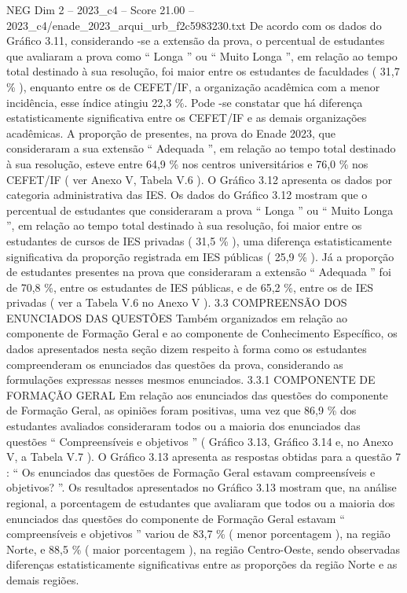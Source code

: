 \begin{textsample}{NEG Dim 2 – 2023\_c4 – Score 21.00 – 2023\_c4/enade\_2023\_arqui\_urb\_f2c5983230.txt}
De acordo com os dados do Gráfico 3.11, considerando -se a extensão da prova, o percentual de estudantes que avaliaram a prova como “ Longa ” ou “ Muito Longa ”, em relação ao tempo total destinado à sua resolução, foi maior entre os estudantes de faculdades ( 31,7 \% ), enquanto entre os de CEFET/IF, a organização acadêmica com a menor incidência, esse índice atingiu 22,3 \%.
Pode -se constatar que há diferença estatisticamente significativa entre os CEFET/IF e as demais organizações acadêmicas.
A proporção de presentes, na prova do Enade 2023, que consideraram a sua extensão “ Adequada ”, em relação ao tempo total destinado à sua resolução, esteve entre 64,9 \% nos centros universitários e 76,0 \% nos CEFET/IF ( ver Anexo V, Tabela V.6 ).
O Gráfico 3.12 apresenta os dados por categoria administrativa das IES.
Os dados do Gráfico 3.12 mostram que o percentual de estudantes que consideraram a prova “ Longa ” ou “ Muito Longa ”, em relação ao tempo total destinado à sua resolução, foi maior entre os estudantes de cursos de IES privadas ( 31,5 \% ), uma diferença estatisticamente significativa da proporção registrada em IES públicas ( 25,9 \% ).
Já a proporção de estudantes presentes na prova que consideraram a extensão “ Adequada ” foi de 70,8 \%, entre os estudantes de IES públicas, e de 65,2 \%, entre os de IES privadas ( ver a Tabela V.6 no Anexo V ). 3.3 COMPREENSÃO DOS ENUNCIADOS DAS QUESTÕES Também organizados em relação ao componente de Formação Geral e ao componente de Conhecimento Específico, os dados apresentados nesta seção dizem respeito à forma como os estudantes compreenderam os enunciados das questões da prova, considerando as formulações expressas nesses mesmos enunciados. 3.3.1 COMPONENTE DE FORMAÇÃO GERAL Em relação aos enunciados das questões do componente de Formação Geral, as opiniões foram positivas, uma vez que 86,9 \% dos estudantes avaliados consideraram todos ou a maioria dos enunciados das questões “ Compreensíveis e objetivos ” ( Gráfico 3.13, Gráfico 3.14 e, no Anexo V, a Tabela V.7 ).
O Gráfico 3.13 apresenta as respostas obtidas para a questão 7 : “ Os enunciados das questões de Formação Geral estavam compreensíveis e objetivos? ”.
Os resultados apresentados no Gráfico 3.13 mostram que, na análise regional, a porcentagem de estudantes que avaliaram que todos ou a maioria dos enunciados das questões do componente de Formação Geral estavam “ compreensíveis e objetivos ” variou de 83,7 \% ( menor porcentagem ), na região Norte, e 88,5 \% ( maior porcentagem ), na região Centro-Oeste, sendo observadas diferenças estatisticamente significativas entre as proporções da região Norte e as demais regiões.

\end{textsample}
